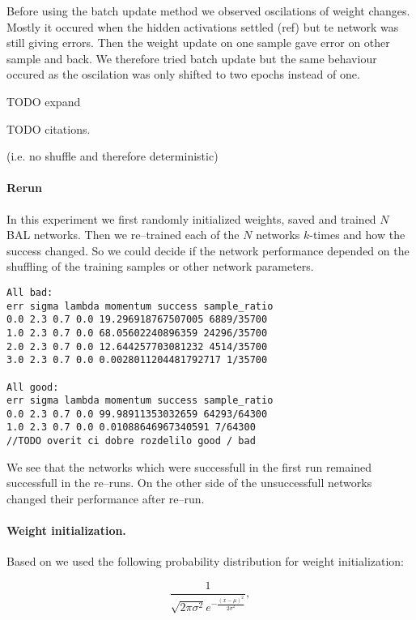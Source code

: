 Before using the batch update method we observed oscilations of weight changes. Mostly it occured when the hidden activations settled (ref) but te network was still giving errors. Then the weight update on one sample gave error on other sample and back. We therefore tried batch update but the same behaviour occured as the oscilation was only shifted to two epochs instead of one.  

TODO expand 

TODO citations. 

(i.e. no shuffle and therefore deterministic)

\paragraph{Rerun} 

In this experiment we first randomly initialized weights, saved and trained $N$ BAL networks. Then we re--trained each of the $N$ networks $k$-times and how the success changed. So we could decide if the network performance depended on the shuffling of the training samples or other network parameters. 

\begin{lstlisting}
All bad: 
err sigma lambda momentum success sample_ratio
0.0 2.3 0.7 0.0 19.296918767507005 6889/35700
1.0 2.3 0.7 0.0 68.05602240896359 24296/35700
2.0 2.3 0.7 0.0 12.644257703081232 4514/35700
3.0 2.3 0.7 0.0 0.0028011204481792717 1/35700

All good: 
err sigma lambda momentum success sample_ratio
0.0 2.3 0.7 0.0 99.98911353032659 64293/64300
1.0 2.3 0.7 0.0 0.01088646967340591 7/64300
//TODO overit ci dobre rozdelilo good / bad
\end{lstlisting}

We see that the networks which were successfull in the first run remained successfull in the re--runs. On the other side of the unsuccessfull networks changed their performance after re--run. 



\paragraph{Weight initialization.} 

Based on \citet{o1996bio} we used the following probability distribution for weight initialization: 

\begin{equation} 
\frac{1}{\sqrt{2\pi \sigma^2} e^{-\frac{(x-\mu)^2}{2\sigma^2}}},
\end{equation} 

